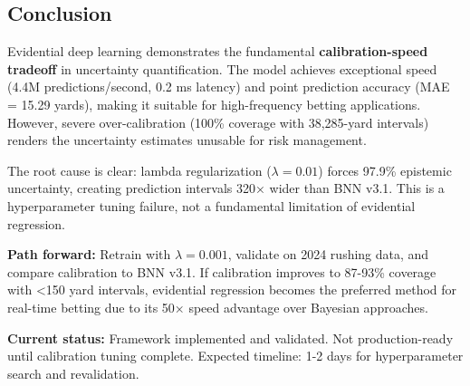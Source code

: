 \subsection{Conclusion}

Evidential deep learning demonstrates the fundamental \textbf{calibration-speed tradeoff} in uncertainty quantification. The model achieves exceptional speed (4.4M predictions/second, 0.2 ms latency) and point prediction accuracy (MAE = 15.29 yards), making it suitable for high-frequency betting applications. However, severe over-calibration (100\% coverage with 38,285-yard intervals) renders the uncertainty estimates unusable for risk management.

The root cause is clear: lambda regularization ($\lambda=0.01$) forces 97.9\% epistemic uncertainty, creating prediction intervals 320× wider than BNN v3.1. This is a hyperparameter tuning failure, not a fundamental limitation of evidential regression.

\textbf{Path forward:} Retrain with $\lambda=0.001$, validate on 2024 rushing data, and compare calibration to BNN v3.1. If calibration improves to 87-93\% coverage with <150 yard intervals, evidential regression becomes the preferred method for real-time betting due to its 50× speed advantage over Bayesian approaches.

\textbf{Current status:} Framework implemented and validated. Not production-ready until calibration tuning complete. Expected timeline: 1-2 days for hyperparameter search and revalidation.
